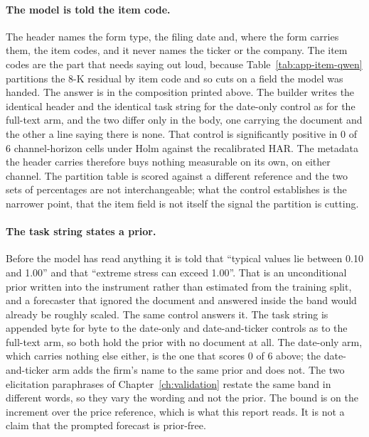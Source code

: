 \paragraph{The model is told the item code.} The header names the form type, the
filing date and, where the form carries them, the item codes, and it never
names the ticker or the company. The item codes are the part that needs saying out loud, because
Table~\ref{tab:app-item-qwen} partitions the 8-K residual by item code and so
cuts on a field the model was handed. The answer is in the composition printed
above. The builder writes the identical header and the identical task string
for the date-only control as for the full-text arm, and the two differ only in
the body, one carrying the document and the other a line saying there is none.
That control is significantly positive in 0 of 6
channel-horizon cells under Holm against the recalibrated HAR. %
The metadata the header carries therefore buys nothing measurable on its own,
on either channel. The partition table is scored against a different reference and the
two sets of percentages are not interchangeable; what the control establishes
is the narrower point, that the item field is not itself the signal the
partition is cutting.

\paragraph{The task string states a prior.} Before the model has read anything
it is told that ``typical values lie between 0.10 and 1.00'' and that
``extreme stress can exceed 1.00''. That is an unconditional prior written into
the instrument rather than estimated from the training split, and a forecaster
that ignored the document and answered inside the band would already be roughly
scaled. The same control answers it. The task string is appended byte for byte
to the date-only and date-and-ticker controls as to the full-text arm, so both
hold the prior with no document at all. The date-only arm, which carries
nothing else either, is the one that scores 0 of 6 above; the date-and-ticker
arm adds the firm's name to the same prior and does not. The two elicitation paraphrases of
Chapter~\ref{ch:validation} restate the same band in different words, so they
vary the wording and not the prior. %
The bound is on the increment over the price reference, which is what this
report reads. It is not a claim that the prompted forecast is prior-free.

